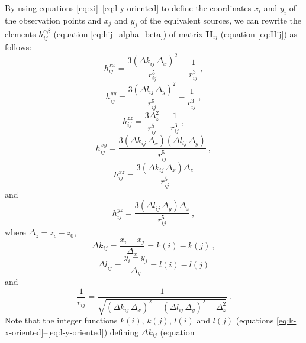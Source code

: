 \documentclass[manuscript,noblind]{geophysics}
\begin{document}
By using equations \ref{eq:xi}--\ref{eq:l-y-oriented} to define the coordinates $x_{i}$ and 
$y_{i}$ of the observation points and $x_{j}$ and $y_{j}$ of the equivalent sources, we can
rewrite the elements $h^{\alpha\beta}_{ij}$ (equation \ref{eq:hij_alpha_beta}) of matrix 
$\mathbf{H}_{ij}$ (equation \ref{eq:Hij}) as follows:
\begin{equation}
	h^{xx}_{ij} = 
	\frac{3 \left( \Delta k_{ij} \, \Delta_{x} \right)^{2}}{r_{ij}^{5}} - \frac{1}{r_{ij}^{3}} \: ,
	\label{eq:hxx_regular}
\end{equation}
\begin{equation}
	h^{yy}_{ij} = 
	\frac{3 \left( \Delta l_{ij} \, \Delta_{y} \right)^{2}}{r_{ij}^{5}} - \frac{1}{r_{ij}^{3}} \: ,
	\label{eq:hyy_regular}
\end{equation}
\begin{equation}
	h^{zz}_{ij} = 
	\frac{3 \Delta_{z}^{2}}{r_{ij}^{5}} - \frac{1}{r_{ij}^{3}} \: ,
	\label{eq:hzz_regular}
\end{equation}
\begin{equation}
	h^{xy}_{ij} = 
	\frac{3 \left( \Delta k_{ij} \, \Delta_{x} \right)\left( \Delta l_{ij} \, \Delta_{y} \right)}{r_{ij}^{5}} \: ,
	\label{eq:hxy_regular}
\end{equation}
\begin{equation}
	h^{xz}_{ij} = 
	\frac{3 \left( \Delta k_{ij} \, \Delta_{x} \right) \Delta_{z}}{r_{ij}^{5}}
	\label{eq:hxz_regular}
\end{equation}
and
\begin{equation}
	h^{yz}_{ij} = 
	\frac{3 \left( \Delta l_{ij} \, \Delta_{y} \right) \Delta_{z}}{r_{ij}^{5}} \: ,
	\label{eq:hyz_regular}
\end{equation}
where $\Delta_{z} = z_{c} - z_{0}$, 
\begin{equation}
	\Delta k_{ij} = \frac{x_{i} - x_{j}}{\Delta_{x}} = k(i) - k(j) \: ,
	\label{eq:Delta_kij}
\end{equation}
\begin{equation}
	\Delta l_{ij} = \frac{y_{i} - y_{j}}{\Delta_{y}} = l(i) - l(j)
	\label{eq:Delta_lij}
\end{equation}
and 
\begin{equation}
	\frac{1}{r_{ij}} = 
	\frac{1}{\sqrt{\left( \Delta k_{ij} \, \Delta_{x} \right)^{2} + \left( \Delta l_{ij} \, \Delta_{y} \right)^{2} + \Delta_{z}^{2}}} \: .
	\label{eq:1_rij_regular}
\end{equation}
Note that the integer functions $k(i)$, $k(j)$, $l(i)$ and $l(j)$ (equations 
\ref{eq:k-x-oriented}--\ref{eq:l-y-oriented}) defining $\Delta k_{ij}$ (equation
\end{document}

